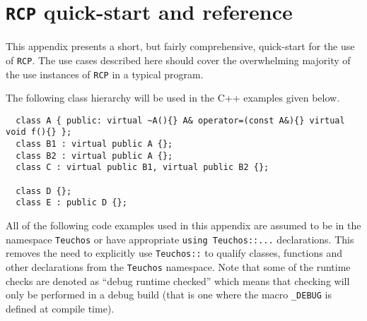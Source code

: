 \documentclass[pdf,ps2pdf,11pt]{SANDreport}
\begin{document}
%
\section{\texttt{RCP} quick-start and reference}
\label{rcpqs:apdx:quickstart}
%

This appendix presents a short, but fairly comprehensive, quick-start
for the use of {}\texttt{RCP}.  The use cases described
here should cover the overwhelming majority of the use instances of
{}\texttt{RCP} in a typical program.

The following class hierarchy will be used in the C++ examples given
below.

{\small\begin{verbatim}
  class A { public: virtual ~A(){} A& operator=(const A&){} virtual void f(){} };
  class B1 : virtual public A {};
  class B2 : virtual public A {};
  class C : virtual public B1, virtual public B2 {};
  
  class D {};
  class E : public D {};
\end{verbatim}}

All of the following code examples used in this appendix are assumed
to be in the namespace {}\texttt{Teuchos} or have appropriate
{}\texttt{using Teuchos::...} declarations.  This removes the need to
explicitly use {}\texttt{Teuchos::} to qualify classes, functions and
other declarations from the {}\texttt{Teuchos} namespace.  Note that
some of the runtime checks are denoted as ``debug runtime checked''
which means that checking will only be performed in a debug build
(that is one where the macro {}\texttt{\_DEBUG} is defined at compile time).
\end{document}
